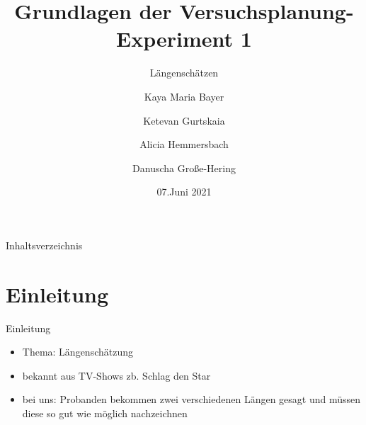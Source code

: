 \documentclass[ ngerman, fontsize= 10pt, headings=big, titlepage=true, xcolor=dvipsnames]{beamer}
\title{Grundlagen der Versuchsplanung-Experiment 1}
\subtitle{Längenschätzen}
\author{Kaya Maria Bayer \and Ketevan Gurtskaia \and Alicia Hemmersbach \and Danuscha Große-Hering}
\date{07.Juni 2021}
\begin{document}
\begin{frame}[plain]
    \maketitle
\end{frame}

\begin{frame}{Inhaltsverzeichnis}
	\tableofcontents
\end{frame}

\section{Einleitung}
\begin{frame}{Einleitung}
\begin{itemize}
\item Thema: Längenschätzung
\item bekannt aus TV-Shows zb. Schlag den Star
\item bei uns: Probanden bekommen zwei verschiedenen Längen gesagt und müssen diese so gut wie möglich nachzeichnen
\end{itemize}
\end{frame}
\end{document}
